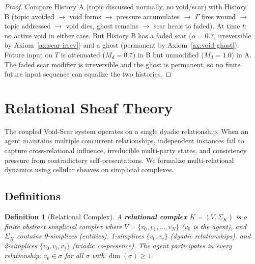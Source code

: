 \documentclass[11pt]{article}
\newtheorem{definition}[theorem]{Definition}
\begin{document}
\begin{proof}
Compare History A (topic discussed normally, no void/scar) with History B (topic avoided $\to$ void forms $\to$ pressure accumulates $\to$ $\Gamma$ fires wound $\to$ topic addressed $\to$ void dies, ghost remains $\to$ scar heals to faded). At time $t$: no active void in either case. But History B has a faded scar ($\alpha = 0.7$, irreversible by Axiom~\ref{ax:scar-irrev}) and a ghost (permanent by Axiom~\ref{ax:void-ghost}). Future input on $T$ is attenuated ($M_d = 0.7$) in B but unmodified ($M_d = 1.0$) in A. The faded scar modifier is irreversible and the ghost is permanent, so no finite future input sequence can equalize the two histories.
\end{proof}

\section{Relational Sheaf Theory}
\label{sec:sheaf}

The coupled Void-Scar system operates on a single dyadic relationship. When an agent maintains multiple concurrent relationships, independent instances fail to capture cross-relational influence, irreducible multi-party states, and consistency pressure from contradictory self-presentations. We formalize multi-relational dynamics using cellular sheaves on simplicial complexes.

\subsection{Definitions}

\begin{definition}[Relational Complex]
A \textbf{relational complex} $K = (V, \Sigma_K)$ is a finite abstract simplicial complex where $V = \{v_0, v_1, \ldots, v_N\}$ ($v_0$ is the agent), and $\Sigma_K$ contains 0-simplices (entities), 1-simplices $\{v_0, v_i\}$ (dyadic relationships), and 2-simplices $\{v_0, v_i, v_j\}$ (triadic co-presence). The agent participates in every relationship: $v_0 \in \sigma$ for all $\sigma$ with $\dim(\sigma) \geq 1$.
\end{definition}
\end{document}

